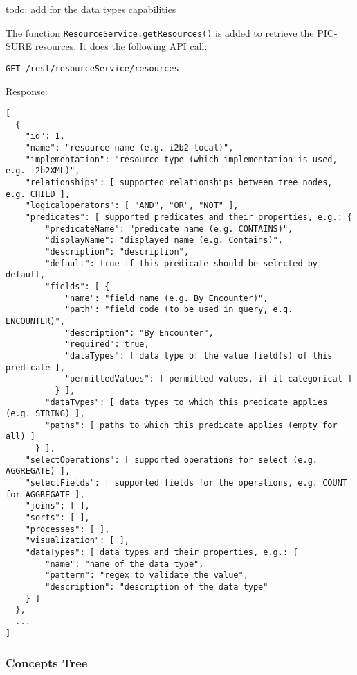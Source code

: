 todo: add for the data types capabilities


The function \verb|ResourceService.getResources()| is added to retrieve the PIC-SURE resources. 
It does the following API call:
\begin{verbatim}
GET /rest/resourceService/resources
\end{verbatim}

Response:
\begin{verbatim}
[
  {
    "id": 1,
    "name": "resource name (e.g. i2b2-local)",
    "implementation": "resource type (which implementation is used, e.g. i2b2XML)",
    "relationships": [ supported relationships between tree nodes, e.g. CHILD ],
    "logicaloperators": [ "AND", "OR", "NOT" ],
    "predicates": [ supported predicates and their properties, e.g.: {
        "predicateName": "predicate name (e.g. CONTAINS)",
        "displayName": "displayed name (e.g. Contains)",
        "description": "description",
        "default": true if this predicate should be selected by default,
        "fields": [ {
            "name": "field name (e.g. By Encounter)",
            "path": "field code (to be used in query, e.g. ENCOUNTER)",
            "description": "By Encounter",
            "required": true,
            "dataTypes": [ data type of the value field(s) of this predicate ],
            "permittedValues": [ permitted values, if it categorical ]
          } ],
        "dataTypes": [ data types to which this predicate applies (e.g. STRING) ],
        "paths": [ paths to which this predicate applies (empty for all) ]
      } ],
    "selectOperations": [ supported operations for select (e.g. AGGREGATE) ],
    "selectFields": [ supported fields for the operations, e.g. COUNT for AGGREGATE ],
    "joins": [ ],
    "sorts": [ ],
    "processes": [ ],
    "visualization": [ ],
    "dataTypes": [ data types and their properties, e.g.: {
        "name": "name of the data type",
        "pattern": "regex to validate the value",
        "description": "description of the data type"
    } ]
  },
  ...
]
\end{verbatim}


\subsubsection{Concepts Tree}

